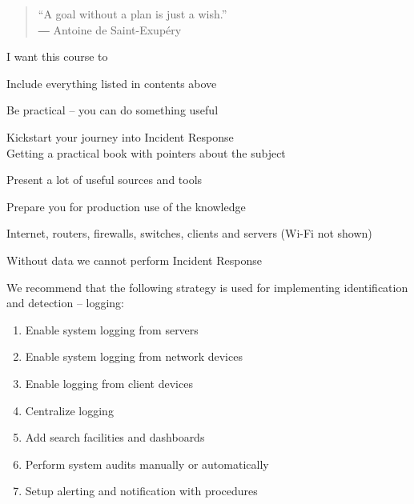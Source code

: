 \documentclass[Screen16to9,17pt]{foils}
\begin{document}


\begin{quote}
  “A goal without a plan is just a wish.”\\
  ― Antoine de Saint-Exupéry
\end{quote}

I want this course to
\begin{list2}
\item Include everything listed in contents above
\item Be practical -- you can do something useful
\item Kickstart your journey into Incident Response\\
Getting a practical book with pointers about the subject
\item Present a lot of useful sources and tools
\item Prepare you for production use of the knowledge
\end{list2}




\begin{list2}
\item Internet, routers, firewalls, switches, clients and servers (Wi-Fi not shown)
\item Without data we cannot perform Incident Response
\end{list2}



We recommend that the following strategy is used for implementing identification and detection -- logging:
\begin{enumerate}
\item[\faSquareO] Enable system logging from servers
\item[\faSquareO] Enable system logging from network devices
\item[\faSquareO] Enable logging from client devices
\item[\faSquareO] Centralize logging
\item[\faSquareO] Add search facilities and dashboards
\item[\faSquareO] Perform system audits manually or automatically
\item[\faSquareO] Setup alerting and notification with procedures
\end{enumerate}
\end{document}
